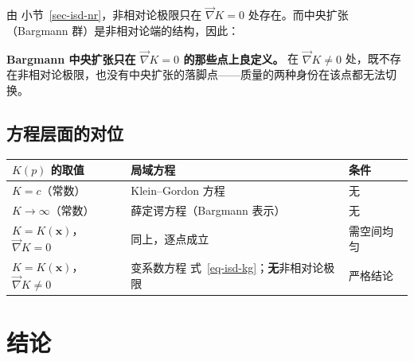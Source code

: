 \documentclass[
  chinese,
  a4paper,
  UTF8,
  12pt,
  oneside,
  openany]{ctexbook}
\newcounter{none} %
\theoremstyle{plain}
\theoremstyle{plain}
\theoremstyle{plain}
\theoremstyle{definition}
\theoremstyle{plain}
\theoremstyle{plain}
\theoremstyle{remark}
\begin{document}
由 小节~\ref{sec-isd-nr}，非相对论极限只在 \(\vec\nabla K=0\)
处存在。而中央扩张（Bargmann 群）是非相对论端的结构，因此：

\textbf{Bargmann 中央扩张只在 \(\vec\nabla K=0\) 的那些点上良定义。} 在
\(\vec\nabla K\neq0\)
处，既不存在非相对论极限，也没有中央扩张的落脚点------质量的两种身份在该点都无法切换。

\subsection{方程层面的对位}\label{ux65b9ux7a0bux5c42ux9762ux7684ux5bf9ux4f4d}

{\def\LTcaptype{none} %
\begin{longtable}[]{@{}
  >{\raggedright\arraybackslash}p{}
  >{\raggedright\arraybackslash}p{}
  >{\raggedright\arraybackslash}p{}@{}}
\toprule\noalign{}
\begin{minipage}[b]{\linewidth}\raggedright
\(K(p)\) 的取值
\end{minipage} & \begin{minipage}[b]{\linewidth}\raggedright
局域方程
\end{minipage} & \begin{minipage}[b]{\linewidth}\raggedright
条件
\end{minipage} \\
\midrule\noalign{}
\endhead
\bottomrule\noalign{}
\endlastfoot
\(K=c\)（常数） & Klein--Gordon 方程 & 无 \\
\(K\to\infty\)（常数） & 薛定谔方程（Bargmann 表示） & 无 \\
\(K=K(\mathbf{x})\)，\(\vec\nabla K=0\) & 同上，逐点成立 & 需空间均匀 \\
\(K=K(\mathbf{x})\)，\(\vec\nabla K\neq0\) & 变系数方程
式~\ref{eq-isd-kg}；\textbf{无}非相对论极限 & 严格结论 \\
\end{longtable}
}

\section{结论}\label{sec-isd-conclusion}
\end{document}
